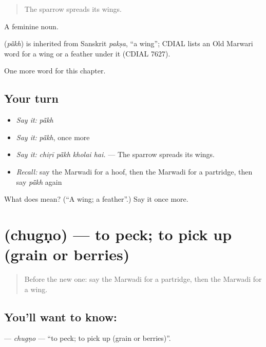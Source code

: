 \begin{quote}
The sparrow spreads its wings.
\end{quote}

A feminine noun.

\begin{cousinweb}
\textbf{} (\emph{pā̃kh}) is inherited from Sanskrit \emph{pakṣa}, \textquotedblleft{}a wing\textquotedblright{}; CDIAL lists an Old Marwari word for a wing or a feather under it (CDIAL 7627).
\end{cousinweb}

\begin{grammarlens}[title={What you've built}]
One more word for this chapter.
\end{grammarlens}

\subsection*{Your turn}
\begin{itemize}
\raggedright
  \item \emph{Say it:} \emph{pā̃kh}
  \item \emph{Say it:} \emph{pā̃kh}, once more
  \item \emph{Say it:} \emph{chiṛī pā̃kh kholai hai.} — The sparrow spreads its wings.
  \item \emph{Recall:} say the Marwadi for a hoof, then the Marwadi for a partridge, then say \emph{pā̃kh} again
\end{itemize}

\begin{tcolorbox}[breakable,colback=teal!4,colframe=teal!35!black,title={Before you move on}]
What does  mean? (\textquotedblleft{}A wing; a feather\textquotedblright{}.) Say it once more.
\end{tcolorbox}
\section[\texorpdfstring{\mw{चुगणो} (chugṇo)}{चुगणो (chugṇo)}]{ (chugṇo) — to peck; to pick up (grain or berries)}

\label{lesson:MW-C237-chugno}



\begin{quote}
Before the new one: say the Marwadi for a partridge, then the Marwadi for a wing.
\end{quote}

\subsection*{You'll want to know: }
\textbf{} — \emph{chugṇo} — \textquotedblleft{}to peck; to pick up (grain or berries)\textquotedblright{}.

